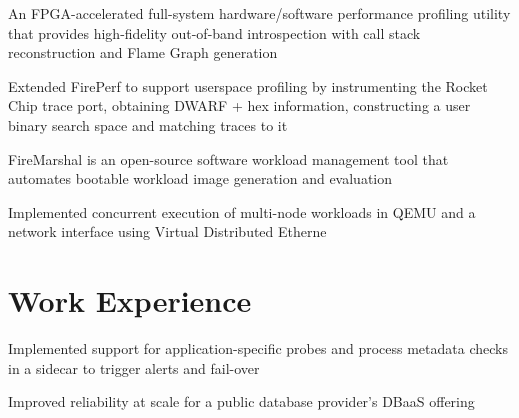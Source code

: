 \documentclass[]{deedy-resume-openfont}
\begin{document}
\begin{minipage}[t]{0.64\textwidth}
\begin{tightemize}
{\normalsize
\item An FPGA-accelerated full-system hardware/software performance profiling utility that provides high-fidelity out-of-band introspection with call stack reconstruction and Flame Graph generation
\item Extended FirePerf to support userspace profiling by instrumenting the Rocket Chip trace port, obtaining DWARF + hex information, constructing a user binary search space and matching traces to it
}
\end{tightemize}

\begin{tightemize}
{\normalsize
\item FireMarshal is an open-source software workload management tool that automates bootable workload image generation and evaluation
\item Implemented concurrent execution of multi-node workloads in QEMU and a network interface using Virtual Distributed Etherne
}
\end{tightemize}



\section{Work Experience}
{\normalsize
\begin{tightemize}
\item Implemented support for application-specific probes and process metadata checks in a sidecar to trigger alerts and fail-over
\item Improved reliability at scale for a public database provider's DBaaS offering
\end{tightemize}
}


\end{minipage}
\end{document}
